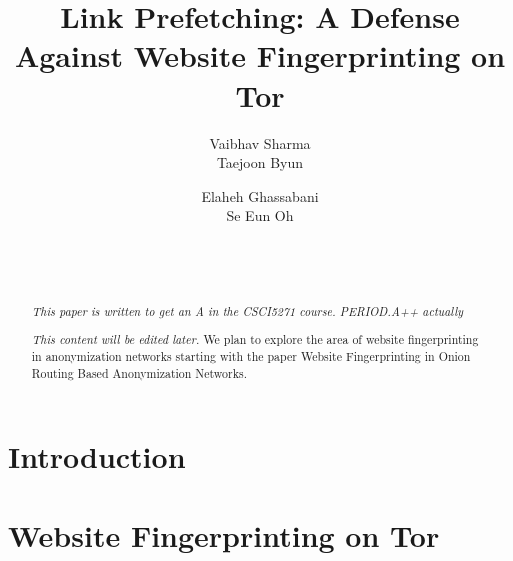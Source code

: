 \documentclass{sig-alternate-05-2015}
\begin{document}
\title{Link Prefetching: A Defense Against Website Fingerprinting on Tor }

\author{
    \alignauthor
        Vaibhav Sharma\\%
    \alignauthor
        Taejoon Byun\\
\and
    \alignauthor
        Elaheh Ghassabani\\
    \alignauthor
        Se Eun Oh\\%
\and
      \\
           \\
}

\maketitle
\begin{abstract}
\emph{This paper is written to get an A in the CSCI5271 course.
PERIOD.A++ actually}

\emph{This content will be edited later.} We plan to explore the area of website fingerprinting in anonymization networks starting with the paper Website Fingerprinting in Onion Routing Based Anonymization Networks.
\end{abstract}



\section{Introduction}


\section{Website Fingerprinting on Tor}

\end{document}
